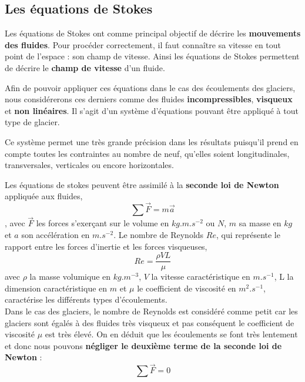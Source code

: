 \documentclass{article}
\begin{document}
\subsection{Les équations de Stokes}

Les équations de Stokes \cite{site1} ont comme principal objectif de décrire les \textbf{mouvements des fluides}. 
Pour procéder correctement, il faut connaître sa vitesse en tout point de l'espace : son champ de vitesse. Ainsi les équations de Stokes permettent de décrire le \textbf{champ de vitesse} d'un fluide. 

Afin de pouvoir appliquer ces équations dans le cas des écoulements des glaciers, nous considérerons ces derniers comme des fluides \textbf{incompressibles}, \textbf{visqueux} et \textbf{non linéaires}. Il s'agit d'un système d'équations pouvant être appliqué à tout type de glacier.

Ce système permet une très grande précision dans les résultats puisqu'il prend en compte toutes les contraintes au nombre de neuf, qu’elles soient longitudinales, transversales, verticales ou encore horizontales. 


Les équations de stokes peuvent être assimilé à la \textbf{seconde loi de Newton} appliquée aux fluides,
\begin{equation}
\sum\vec{F}=m\vec{a}
\end{equation}
, avec  $\vec{F}$ les forces s'exerçant sur le volume en $kg.m.s^{-2}$ ou $N$, $m$ sa masse en $kg$ et  $a$ son accélération en $m.s^{-2}$.
\newpage
Le nombre de Reynolds $Re$, qui représente le rapport entre les forces d'inertie et les forces visqueuses,
 \begin{equation}
\textit{Re} = \frac{\rho V L}{\mu}
\end{equation}
avec $\rho$ la masse volumique en $kg.m^{-3}$, $V$ la vitesse caractéristique en $m.s^{-1}$, L la dimension caractéristique en $m$ et $\mu$ le coefficient de viscosité en $m^{2}.s^{-1}$, caractérise les différents types d'écoulements. \\
Dans le cas des glaciers, le nombre de Reynolds est considéré comme petit car les glaciers sont égalés à des fluides très visqueux et pas conséquent le coefficient de viscosité $\mu$ est très élevé. On en déduit que les écoulements se font très lentement et donc nous pouvons \textbf{négliger le deuxième terme de la seconde loi de Newton} :
\begin{equation}
\sum\vec{F}= 0
\label{somme force}
\end{equation}
\end{document}
